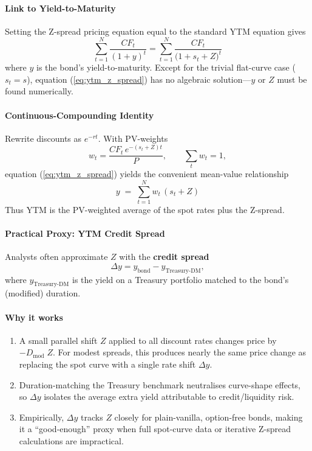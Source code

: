 \documentclass{article}
\begin{document}
\begin{appendices}
\paragraph*{Link to Yield-to-Maturity}
Setting the Z-spread pricing equation equal to the standard YTM equation gives
\begin{equation}
\label{eq:ytm_z_spread}
\sum_{t=1}^{N}\frac{CF_t}{(1+y)^t}
=\sum_{t=1}^{N}\frac{CF_t}{\bigl(1+s_t+Z\bigr)^t}
\end{equation}
where $y$ is the bond's yield-to-maturity. Except for the trivial flat-curve case ($s_t=s$), equation (\ref{eq:ytm_z_spread}) has no algebraic solution—$y$ or $Z$ must be found numerically.

\paragraph*{Continuous-Compounding Identity}
Rewrite discounts as $e^{-r t}$. With PV-weights
\begin{equation*}
w_t=\frac{CF_t\,e^{-(s_t+Z)t}}{P},\qquad\sum_{t}w_t=1,
\end{equation*}
equation (\ref{eq:ytm_z_spread}) yields the convenient mean-value relationship
\begin{equation}
y \;=\; \sum_{t=1}^{N} w_t\,(s_t+Z)\tag{A2}
\end{equation}
Thus YTM is the PV-weighted average of the spot rates plus the Z-spread.

\paragraph*{Practical Proxy: YTM Credit Spread}
Analysts often approximate $Z$ with the \textbf{credit spread}
\begin{equation*}
\Delta y = y_{\text{bond}} - y_{\text{Treasury-DM}},
\end{equation*}
where $y_{\text{Treasury-DM}}$ is the yield on a Treasury portfolio matched to the bond's (modified) duration.

\paragraph*{Why it works}
\begin{enumerate}
    \item A small parallel shift $Z$ applied to all discount rates changes price by $-D_{\text{mod}}\;Z$. For modest spreads, this produces nearly the same price change as replacing the spot curve with a single rate shift $\Delta y$.
    \item Duration-matching the Treasury benchmark neutralises curve-shape effects, so $\Delta y$ isolates the average extra yield attributable to credit/liquidity risk.
    \item Empirically, $\Delta y$ tracks $Z$ closely for plain-vanilla, option-free bonds, making it a ``good-enough'' proxy when full spot-curve data or iterative Z-spread calculations are impractical.
\end{enumerate}


\end{appendices}
\end{document}
